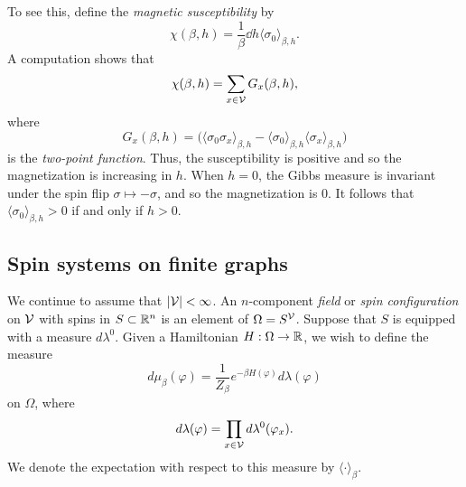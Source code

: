 To see this, define the \emph{magnetic susceptibility} by
\begin{equation}
\chi(\beta, h)
	=
\frac{1}{\beta} \dd{}{h} \langle \sigma_0 \rangle_{\beta,h}.
\end{equation}
A computation shows that
\begin{equation}
\chi(\beta, h) = \sum_{x\in\mathcal{V}} G_x(\beta, h),
\end{equation}
where
\begin{equation}
G_x(\beta, h)
	=
\Big(
	\langle \sigma_0 \sigma_x \rangle_{\beta,h}
		-
	\langle \sigma_0 \rangle_{\beta,h} \langle \sigma_x \rangle_{\beta,h}
\Big)
\end{equation}
is the \emph{two-point function}.
Thus, the susceptibility is positive and so the magnetization is increasing
in $h$. When $h = 0$, the Gibbs measure is invariant under the spin flip
$\sigma \mapsto -\sigma$, and so the magnetization is $0$. It follows that
$\langle \sigma_0 \rangle_{\beta,h} > 0$ if and only if $h > 0$.


\subsection{Spin systems on finite graphs}

We continue to assume that $|\mathcal{V}| < \infty$.
An $n$-component \emph{field} or \emph{spin configuration} on $\mathcal{V}$
with spins in $S \subset {\mathbb R}^n$ is an element of $\Omega = S^{\mathcal{V}}$.
Suppose that $S$ is equipped with a measure $d\lambda^0$.
Given a Hamiltonian $H : \Omega \rightarrow {\mathbb R}$, we wish to define the measure
\begin{equation}
d\mu_\beta(\varphi)
  =
\frac{1}{Z_\beta} e^{-\beta H(\varphi)} d\lambda(\varphi)
\end{equation}
on $\Omega$, where
\begin{equation}
d\lambda(\varphi) = \prod_{x\in\mathcal{V}} d\lambda^0(\varphi_x).
\end{equation}
We denote the expectation with respect to this measure by $\langle\cdot\rangle_\beta$.
% 

